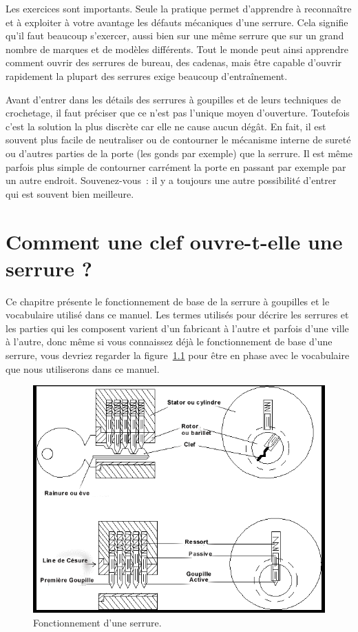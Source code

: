 \documentclass[a4paper,french,11pt,twoside]{report}
\begin{document}
Les exercices sont importants. Seule la pratique permet d'apprendre à reconnaître et à exploiter à votre avantage les défauts mécaniques d'une serrure. Cela signifie qu'il faut beaucoup s'exercer, aussi bien sur une même serrure que sur un grand nombre de marques et de modèles différents. Tout le monde peut ainsi apprendre comment ouvrir des serrures de bureau, des cadenas, mais être capable d'ouvrir rapidement la plupart des serrures exige beaucoup d'entraînement.

Avant d'entrer dans les détails des serrures à goupilles et de leurs techniques de crochetage, il faut préciser que ce n'est pas l'unique moyen d'ouverture. Toutefois c'est la solution la plus discrète car elle ne cause aucun dégât. En fait, il est souvent plus facile de neutraliser ou de contourner le mécanisme interne de sureté ou d'autres parties de la porte (les gonds par exemple) que la serrure. Il est même parfois plus simple de contourner carrément la porte en passant par exemple par un autre endroit. Souvenez-vous~: il y a toujours une autre possibilité d'entrer qui est souvent bien meilleure.

\chapter{\label{chap:comment_clef_serrure}Comment une clef ouvre-t-elle une serrure ?}
Ce chapitre présente le fonctionnement de base de la serrure à goupilles et le vocabulaire utilisé dans ce manuel. Les termes utilisés pour décrire les serrures et les parties qui les composent varient d'un fabricant à l'autre et parfois d'une ville à l'autre, donc même si vous connaissez déjà le fonctionnement de base d'une serrure, vous devriez regarder la figure~\ref{fonctionnement_serrure} pour être en phase avec le vocabulaire que nous utiliserons dans ce manuel.

\begin{figure}[h]
  \includegraphics[width=16cm]{images/image1}
  \caption{Fonctionnement d'une serrure.\label{fonctionnement_serrure}}
\end{figure}
\end{document}
